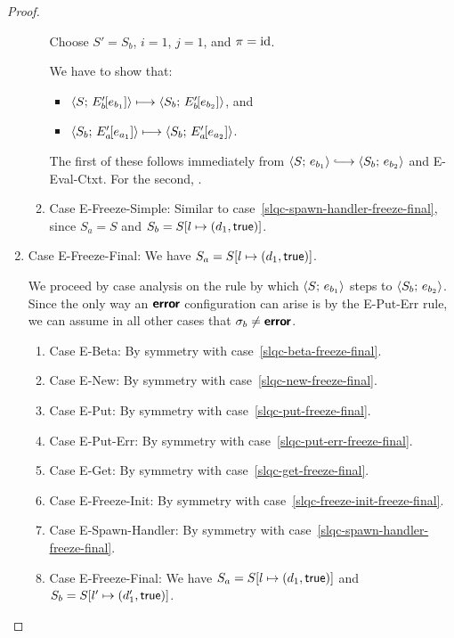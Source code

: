 \begin{proof}
\begin{enumerate}
\begin{enumerate}
      Choose $S' = S_b$, $i = 1$, $j = 1$, and $\pi = \mathrm{id}$.

      We have to show that:
      \begin{itemize}
      \item $\langle S;\, E'_b\hspace{-1mm}\left[e_{b_1}\right] \rangle \longmapsto
        \langle S_b;\, E'_b\hspace{-1mm}\left[e_{b_2}\right] \rangle$, and
      \item $\langle S_b;\, E'_a\hspace{-1mm}\left[e_{a_1}\right] \rangle \longmapsto
        \langle S_b;\, E'_a\hspace{-1mm}\left[e_{a_2}\right] \rangle$.
      \end{itemize}

      The first of these follows immediately from $\config{S}{e_{b_1}}
      \parstepsto \config{S_b}{e_{b_2}}$ and {\sc E-Eval-Ctxt}.  For
      the second, \TODO{}.

    \item \label{slqc-spawn-handler-freeze-simple}Case {\sc
      E-Freeze-Simple}: Similar to
      case~\ref{slqc-spawn-handler-freeze-final}, since $S_a = S$ and
      $S_b = S[l \mapsto (d_1, \textsf{true})]$.
    \end{enumerate}

  \item Case {\sc E-Freeze-Final}: We have $S_a =
    S[l \mapsto (d_1, \textsf{true})]$.

    We proceed by case analysis on the rule by which
    $\langle S;\, e_{b_1} \rangle$ steps to $\langle S_b;\, e_{b_2} \rangle$.  Since the
    only way an $\textbf{\textsf{error}}$ configuration can arise is by the {\sc
      E-Put-Err} rule, we can assume in all other cases that $\sigma_b
    \neq \textbf{\textsf{error}}$.
    \begin{enumerate}
    \item \label{slqc-freeze-final-beta}Case {\sc E-Beta}: By symmetry with case~\ref{slqc-beta-freeze-final}.
    \item \label{slqc-freeze-final-new}Case {\sc E-New}: By symmetry with case~\ref{slqc-new-freeze-final}.
    \item \label{slqc-freeze-final-put}Case {\sc E-Put}: By symmetry with case~\ref{slqc-put-freeze-final}.
    \item \label{slqc-freeze-final-put-err}Case {\sc E-Put-Err}: By symmetry with case~\ref{slqc-put-err-freeze-final}.
    \item \label{slqc-freeze-final-get}Case {\sc E-Get}: By symmetry with case~\ref{slqc-get-freeze-final}.
    \item \label{slqc-freeze-final-freeze-init}Case {\sc E-Freeze-Init}: By symmetry with case~\ref{slqc-freeze-init-freeze-final}.
    \item \label{slqc-freeze-final-spawn-handler}Case {\sc E-Spawn-Handler}: By symmetry with case~\ref{slqc-spawn-handler-freeze-final}.
    \item \label{slqc-freeze-final-freeze-final}Case {\sc
      E-Freeze-Final}: We have $S_a = S[l \mapsto (d_1, \textsf{true})]$
      and $S_b = S[l' \mapsto (d'_1, \textsf{true})]$.


\end{enumerate}
\end{enumerate}
\end{proof}
